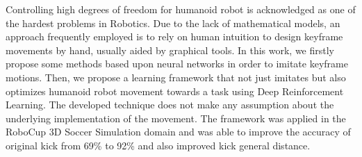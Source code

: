 Controlling high degrees of freedom for humanoid robot is acknowledged as one of the hardest problems in Robotics. Due to the lack of mathematical models, an approach frequently employed is to rely on human intuition to design keyframe movements by hand, usually aided by graphical tools. In this work, we firstly propose some methods based upon neural networks in order to imitate keyframe motions. Then, we  propose a learning framework that not just imitates but also optimizes humanoid robot movement towards a task using Deep Reinforcement Learning. The developed technique does not make any assumption about the underlying implementation of the movement. The framework was applied in the RoboCup 3D Soccer Simulation domain and was able to improve the accuracy of original kick from 69\% to 92\% and also improved kick general distance.